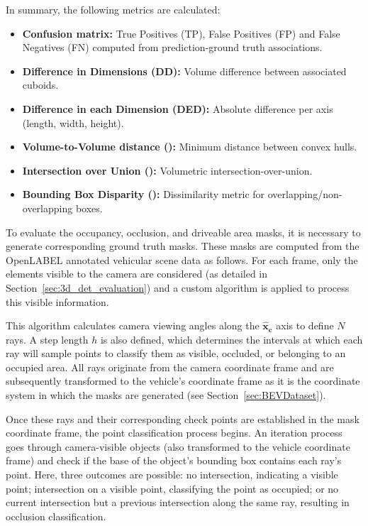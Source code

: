 In summary, the following metrics are calculated:
\begin{itemize}
    \item \textbf{Confusion matrix:} True Positives (TP), False Positives (FP) and False Negatives (FN) computed from prediction-ground truth associations.
    \item \textbf{Difference in Dimensions (DD):} Volume difference between associated cuboids.
    \item \textbf{Difference in each Dimension (DED):} Absolute difference per axis (length, width, height).  
    \item \textbf{Volume-to-Volume distance ():} Minimum distance between convex hulls.
    \item \textbf{Intersection over Union ():} Volumetric intersection-over-union.
    \item \textbf{Bounding Box Disparity ():} Dissimilarity metric for overlapping/non-overlapping boxes.
\end{itemize}

 \label{sec:bev_masks_evaluation_methodology}
To evaluate the occupancy, occlusion, and driveable area masks, it is necessary to generate corresponding ground truth masks. These masks are computed from the OpenLABEL annotated vehicular scene data as follows. For each frame, only the elements visible to the camera are considered (as detailed in Section~\ref{sec:3d_det_evaluation}) and a custom algorithm is applied to process this visible information.

This algorithm calculates camera viewing angles along the $\mathbf{\hat{x}_c}$ axis to define $N$ rays. A step length $h$ is also defined, which determines the intervals at which each ray will sample points to classify them as visible, occluded, or belonging to an occupied area. All rays originate from the camera coordinate frame and are subsequently transformed to the vehicle's coordinate frame as it is the coordinate system in which the  masks are generated (see Section~\ref{sec:BEVDataset}).

Once these rays and their corresponding check points are established in the  mask coordinate frame, the point classification process begins. An iteration process goes through camera-visible objects (also transformed to the vehicle coordinate frame) and check if the base of the object's bounding box contains each ray's point. Here, three outcomes are possible: no intersection, indicating a visible point; intersection on a visible point, classifying the point as occupied; or no current intersection but a previous intersection along the same ray, resulting in occlusion classification.

